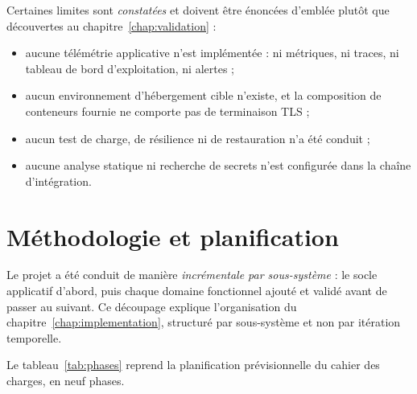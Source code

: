 Certaines limites sont \emph{constatées} et doivent être énoncées d'emblée
plutôt que découvertes au chapitre~\ref{chap:validation} :

\begin{itemize}[leftmargin=*]
  \item aucune télémétrie applicative n'est implémentée : ni métriques, ni
        traces, ni tableau de bord d'exploitation, ni alertes ;
  \item aucun environnement d'hébergement cible n'existe, et la composition de
        conteneurs fournie ne comporte pas de terminaison TLS ;
  \item aucun test de charge, de résilience ni de restauration n'a été conduit ;
  \item aucune analyse statique ni recherche de secrets n'est configurée dans
        la chaîne d'intégration.
\end{itemize}

\section{Méthodologie et planification}
\label{sec:method_planning}

Le projet a été conduit de manière \emph{incrémentale par sous-système} : le
socle applicatif d'abord, puis chaque domaine fonctionnel ajouté et validé
avant de passer au suivant. Ce découpage explique l'organisation du
chapitre~\ref{chap:implementation}, structuré par sous-système et non par
itération temporelle.

Le tableau~\ref{tab:phases} reprend la planification prévisionnelle du cahier
des charges, en neuf phases.

